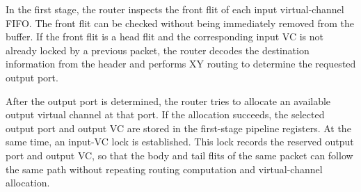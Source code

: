 In the first stage, the router inspects the front flit of each input virtual-channel FIFO. The front flit can be checked without being immediately removed from the buffer. If the front flit is a head flit and the corresponding input VC is not already locked by a previous packet, the router decodes the destination information from the header and performs XY routing to determine the requested output port.

After the output port is determined, the router tries to allocate an available output virtual channel at that port. If the allocation succeeds, the selected output port and output VC are stored in the first-stage pipeline registers. At the same time, an input-VC lock is established. This lock records the reserved output port and output VC, so that the body and tail flits of the same packet can follow the same path without repeating routing computation and virtual-channel allocation.
